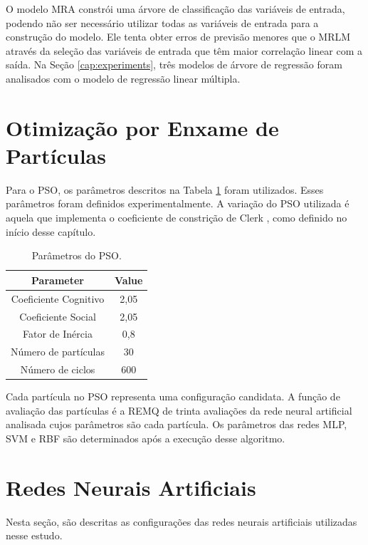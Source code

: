 O modelo MRA constrói uma árvore de classificação das variáveis de entrada, podendo não ser necessário utilizar todas as variáveis de entrada para a construção do modelo. Ele tenta obter erros de previsão menores que o MRLM através da seleção das variáveis de entrada que têm maior correlação linear com a saída. Na Seção \ref{cap:experiments}, três modelos de árvore de regressão foram analisados com o modelo de regressão linear múltipla.

\section{Otimização por Enxame de Partículas}

Para o PSO, os parâmetros descritos na Tabela \ref{tab:pso_configuration} foram utilizados. Esses parâmetros foram definidos experimentalmente. A variação do PSO utilizada é aquela que implementa o coeficiente de constrição de Clerk \cite{clerc1999swarm}, como definido no início desse capítulo.

\begin{table}[h]
\caption{Parâmetros do PSO.}\label{tab:pso_configuration} \centering
\begin{tabular}{|c|c|}
  \hline
  Parameter & Value \\
  \hline
  Coeficiente Cognitivo & 2,05 \\
  \hline
  Coeficiente Social & 2,05 \\
  \hline
  Fator de Inércia & 0,8 \\
  \hline
  Número de partículas & 30 \\
  \hline
  Número de ciclos & 600 \\
  \hline
\end{tabular}
\end{table}

Cada partícula no PSO representa uma configuração candidata. A função de avaliação das partículas é a REMQ de trinta avaliações da rede neural artificial analisada cujos parâmetros são cada partícula. Os parâmetros das redes MLP, SVM e RBF são determinados após a execução desse algoritmo.

\section{Redes Neurais Artificiais}
\label{sec:rnas}

Nesta seção, são descritas as configurações das redes neurais artificiais utilizadas nesse estudo.

